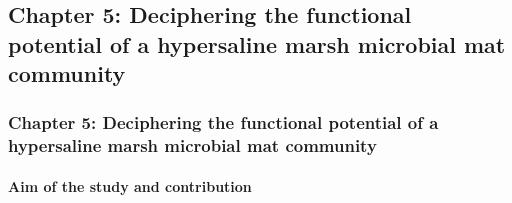 \documentclass{beamer}
\begin{document}


         


 



   \begin{darkframes}
      \section{
         \textbf{Chapter 5:} Deciphering the functional potential of a hypersaline marsh microbial mat community
      }

      \begin{frame}
         \frametitle{\textbf{Chapter 5:} Deciphering the functional potential of a hypersaline marsh microbial mat community}
         \framesubtitle{Aim of the study and contribution}



      \end{frame}

   \end{darkframes}



\end{document}

